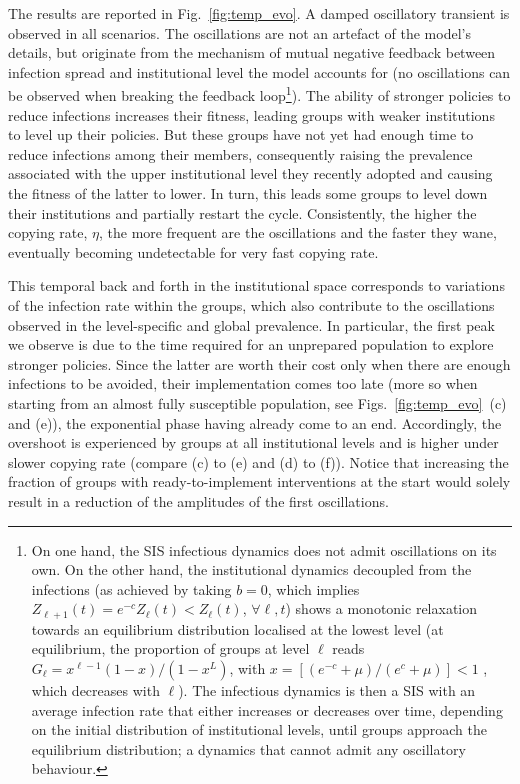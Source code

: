 The results are reported in Fig.~\ref{fig:temp_evo}. A damped oscillatory transient is observed in all scenarios. The oscillations are not an artefact of the model's details, but originate from the mechanism of mutual negative feedback between infection spread and institutional level the model accounts for (no oscillations can be observed when breaking the feedback loop\footnote{On one hand, the SIS infectious dynamics does not admit oscillations on its own. On the other hand, the institutional dynamics decoupled from the infections (as achieved by taking $b = 0$, which implies $Z_{\ell+1}(t) = e^{-c} Z_\ell(t) < Z_\ell(t)$, $\forall \ell, t$) shows a monotonic relaxation towards an equilibrium distribution localised at the lowest level (at equilibrium, the proportion of groups at level $\ell$ reads $G_\ell = x^{\ell-1}(1-x)/(1-x^L)$, with $x = [(e^{-c}+\mu)/(e^{c}+\mu)] < 1$ , which decreases with $\ell$). The infectious dynamics is then a SIS with an average infection rate that either increases or decreases over time, depending on the initial distribution of institutional levels, until groups approach the equilibrium distribution; a dynamics that cannot admit any oscillatory behaviour.}). The ability of stronger policies to reduce infections increases their fitness, leading groups with weaker institutions to level up their policies. But these groups have not yet had enough time to reduce infections among their members, consequently raising the prevalence associated with the upper institutional level they recently adopted and causing the fitness of the latter to lower. In turn, this leads some groups to level down their institutions and partially restart the cycle. Consistently, the higher the copying rate, $\eta$, the more frequent are the oscillations and the faster they wane, eventually becoming undetectable for very fast copying rate.

This temporal back and forth in the institutional space corresponds to variations of the infection rate within the groups, which also contribute to the oscillations observed in the level-specific and global prevalence. In particular, the first peak we observe is due to the time required for an unprepared population to explore stronger policies. Since the latter are worth their cost only when there are enough infections to be avoided, their implementation comes too late (more so when starting from an almost fully susceptible population, see Figs.~\ref{fig:temp_evo}~(c) and (e)), the exponential phase having already come to an end. Accordingly, the overshoot is experienced by groups at all institutional levels and is higher under slower copying rate (compare (c) to (e) and (d) to (f)). Notice that increasing the fraction of groups with ready-to-implement interventions at the start would solely result in a reduction of the amplitudes of the first oscillations.

